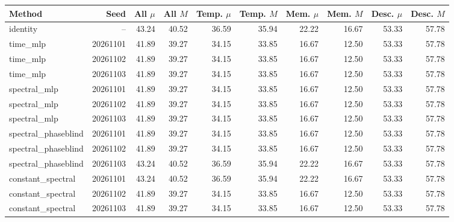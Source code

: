 \begin{tabular}{lr*{8}{r}}
\toprule
Method & Seed & All $\mu$ & All $M$ & Temp. $\mu$ & Temp. $M$ & Mem. $\mu$ & Mem. $M$ & Desc. $\mu$ & Desc. $M$ \\
\midrule
identity & -- & 43.24 & 40.52 & 36.59 & 35.94 & 22.22 & 16.67 & 53.33 & 57.78 \\
time\_mlp & 20261101 & 41.89 & 39.27 & 34.15 & 33.85 & 16.67 & 12.50 & 53.33 & 57.78 \\
time\_mlp & 20261102 & 41.89 & 39.27 & 34.15 & 33.85 & 16.67 & 12.50 & 53.33 & 57.78 \\
time\_mlp & 20261103 & 41.89 & 39.27 & 34.15 & 33.85 & 16.67 & 12.50 & 53.33 & 57.78 \\
spectral\_mlp & 20261101 & 41.89 & 39.27 & 34.15 & 33.85 & 16.67 & 12.50 & 53.33 & 57.78 \\
spectral\_mlp & 20261102 & 41.89 & 39.27 & 34.15 & 33.85 & 16.67 & 12.50 & 53.33 & 57.78 \\
spectral\_mlp & 20261103 & 41.89 & 39.27 & 34.15 & 33.85 & 16.67 & 12.50 & 53.33 & 57.78 \\
spectral\_phaseblind & 20261101 & 41.89 & 39.27 & 34.15 & 33.85 & 16.67 & 12.50 & 53.33 & 57.78 \\
spectral\_phaseblind & 20261102 & 41.89 & 39.27 & 34.15 & 33.85 & 16.67 & 12.50 & 53.33 & 57.78 \\
spectral\_phaseblind & 20261103 & 43.24 & 40.52 & 36.59 & 35.94 & 22.22 & 16.67 & 53.33 & 57.78 \\
constant\_spectral & 20261101 & 43.24 & 40.52 & 36.59 & 35.94 & 22.22 & 16.67 & 53.33 & 57.78 \\
constant\_spectral & 20261102 & 41.89 & 39.27 & 34.15 & 33.85 & 16.67 & 12.50 & 53.33 & 57.78 \\
constant\_spectral & 20261103 & 41.89 & 39.27 & 34.15 & 33.85 & 16.67 & 12.50 & 53.33 & 57.78 \\
\bottomrule
\end{tabular}
